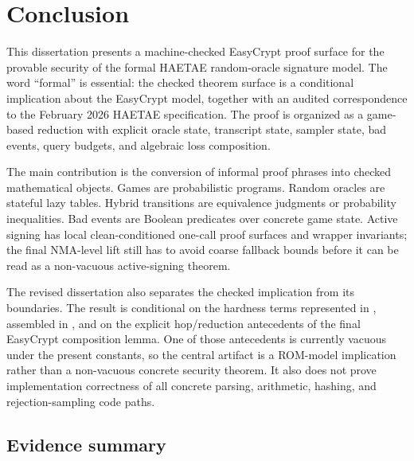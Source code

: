 \chapter{Conclusion}
\label{ch:conclusion}

This dissertation presents a machine-checked EasyCrypt proof surface for the
provable security of the formal HAETAE random-oracle signature model.  The word
``formal'' is essential: the checked theorem surface is a conditional
implication about the EasyCrypt model, together with an audited correspondence
to the February 2026 HAETAE specification.  The proof is organized as a
game-based reduction with explicit oracle state, transcript state, sampler
state, bad events, query budgets, and algebraic loss composition.

The main contribution is the conversion of informal proof phrases into checked
mathematical objects.  Games are probabilistic programs.  Random oracles are
stateful lazy tables.  Hybrid transitions are equivalence judgments or
probability inequalities.  Bad events are Boolean predicates over concrete game
state.  Active signing has local clean-conditioned one-call proof surfaces and
wrapper invariants; the final NMA-level lift still has to avoid coarse fallback
bounds before it can be read as a non-vacuous active-signing theorem.

The revised dissertation also separates the checked implication from its
boundaries.  The result is conditional on the hardness terms represented in
, assembled in , and on the
explicit hop/reduction antecedents of the final EasyCrypt composition lemma.
One of those antecedents is currently vacuous under the present
 constants, so the central artifact is a
ROM-model implication rather than a non-vacuous concrete security theorem.  It
also does not prove implementation correctness of all concrete parsing,
arithmetic, hashing, and rejection-sampling code paths.

\section*{Evidence summary}

